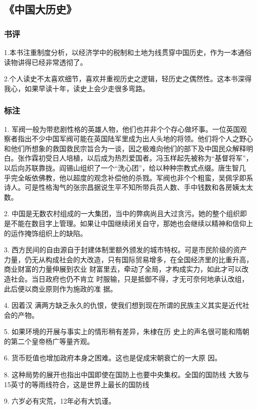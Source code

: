 \subsection{《中国大历史》}
\subsubsection{书评}
1.本书注重制度分析，以经济学中的税制和土地为线贯穿中国历史，作为一本通俗读物讲得已经非常透彻了。

2.个人读史不太喜欢细节，喜欢并重视历史之逻辑，轻历史之偶然性。这本书深得我心，如果早读十年，读史上会少走很多弯路。

\subsubsection{标注}
1. 军阀一般为带悲剧性格的英雄人物，他们也并非个个存心做坏事。一位英国观察者指出不少中国军阀可能在英国陆军里成为出人头地的将领。他们将个人之野心和他们所想象的救国救民宗旨合为一谈，因之极难向他们的部下及中国民众解释明 白。张作霖初受日人培植，以后成为热烈爱国者。冯玉样起先被称为“基督将军”， 以后向苏联靠拢。阎锡山组织了一个“洗心团”，给以种种宗教式点缀。唐生智几 乎完全皈依佛教，他以超度的观念补偿他的杀戮。军阀也非个个粗蛮，吴佩孚即系诗人。可是性格淘气的张宗昌据说生平不知所带兵员人数、手中钱数和各房姨太太 数。

2. 中国是无数农村组成的一大集团，当中的弊病尚且大过贪污。她的整个组织即是不能在数目字上管理。如果让中国继续闭关自守，那她也会继续以精神和信仰上的运作掩饰组织上的缺陷。

3. 西方民间的自由源自于封建体制里额外颁发的城市特权。可是市民阶级的资产力量，仍无从构成社会的大改造，只有国际贸易增多，在全国经济里的比重升高，商业财富的力量伸展到农业 财富里去，牵动了全局，才构成实力，如此才可以改造社会。当日政府也仍不肯立 时服输，只是抵御不得，才无可奈何地承认改组，此后便以商业原则作为施政的准 据。

4. 因着汉 满两方缺乏永久的仇恨，使我们想到现在所谓的民族主义其实是近代社会的产物。

5. 如果环境的开展与事实上的情形稍有差异，朱棣在历 史上的声名很可能和隋朝的第二个皇帝杨广等量齐观。

6. 货币贬值也增加政府本身之困难。这也是促成宋朝衰亡的一大原 因。


8. 这种局势的展开也指出中国即使在国防上也要中央集权。全国的国防线 大致与15英寸的等雨线符合，这是世界上最长的国防线

9. 六岁必有灾荒，12年必有大饥谨。
